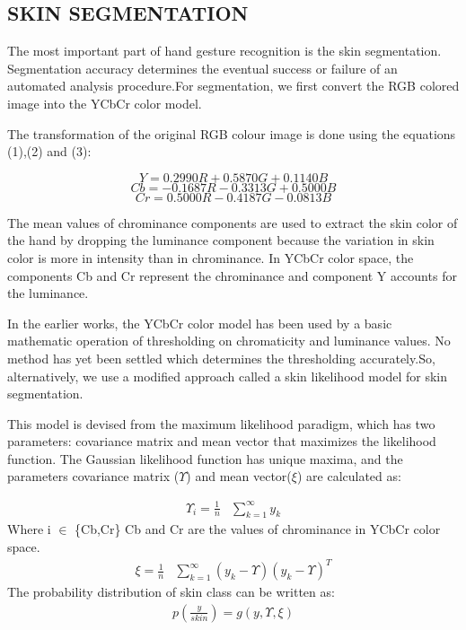 \documentclass[conference]{IEEEtran}
\begin{document}
\subsection{SKIN SEGMENTATION}

The most important part of hand gesture recognition is the skin segmentation. Segmentation accuracy determines the eventual success or failure of an automated analysis procedure.For segmentation, we first convert the RGB colored image into the YCbCr color model.

The transformation of the original RGB colour image is done using the equations (1),(2) and (3):

\begin{equation}
 Y = 0.2990R + 0.5870G + 0.1140B
\end{equation}
\begin{equation}
 Cb = -0.1687R - 0.3313G + 0.5000B
\end{equation}
\begin{equation}
 Cr = 0.5000R - 0.4187G - 0.0813B
\end{equation}


The mean values of chrominance components are used to extract the skin color of the hand by dropping the luminance component because the variation in skin color is more in intensity than in chrominance. In YCbCr color space, the components Cb and Cr represent the chrominance and component Y accounts for the luminance.

In the earlier works, the YCbCr color model has been used by a basic mathematic operation of thresholding on chromaticity and luminance values. No method has yet been settled which determines the thresholding accurately.So, alternatively, we use a modified approach called a skin likelihood model for skin segmentation.

This model is devised from the maximum likelihood paradigm, which has two parameters: covariance matrix and mean vector that maximizes the likelihood function. The Gaussian likelihood function \cite{vishwakarma2015efficient} has unique maxima, and the parameters  covariance matrix ($\Upsilon$) and mean vector($\xi$) are calculated as:

\begin{equation}
\begin{aligned}
\Upsilon_i = \frac{1}{n} & \sum_{k=1}^\infty y_k
\end{aligned}
\end{equation}
Where i $\in$ \{Cb,Cr\}  Cb and Cr are the values of chrominance in YCbCr color space.
\begin{equation}
\begin{aligned}
\xi = \frac{1}{n} & \sum_{k=1}^\infty \left(y_k - \Upsilon \right)\left(y_k - \Upsilon \right)^T
\end{aligned}
\end{equation}
The probability distribution of skin class can be written as:
\begin{equation}
\begin{aligned}
p(\frac{y}{skin}) =  g(y,\Upsilon,\xi)
\end{aligned}
\end{equation}
\end{document}

